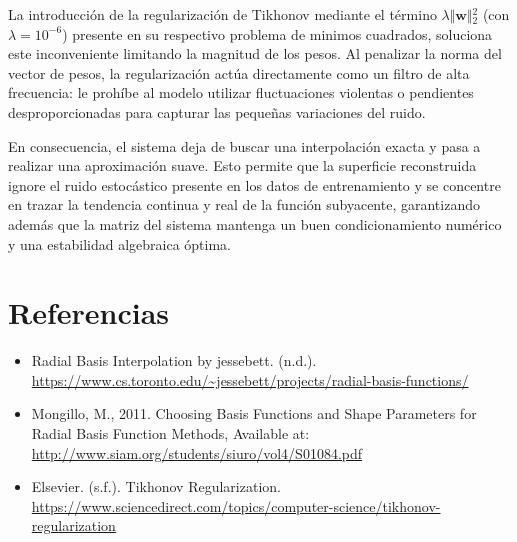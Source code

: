 \documentclass[12pt]{article}
\begin{document}
        La introducción de la regularización de Tikhonov mediante el término $\lambda \Vert{}\mathbf{w}\Vert{}_2^2$ (con $\lambda = 10^{-6}$) presente en su respectivo problema de minimos cuadrados, soluciona este inconveniente limitando la magnitud de los pesos. Al penalizar la norma del vector de pesos, la regularización actúa directamente como un filtro de alta frecuencia: le prohíbe al modelo utilizar fluctuaciones violentas o pendientes desproporcionadas para capturar las pequeñas variaciones del ruido.

        En consecuencia, el sistema deja de buscar una interpolación exacta y pasa a realizar una aproximación suave. Esto permite que la superficie reconstruida ignore el ruido estocástico presente en los datos de entrenamiento y se concentre en trazar la tendencia continua y real de la función subyacente, garantizando además que la matriz del sistema mantenga un buen condicionamiento numérico y una estabilidad algebraica óptima.

    \newpage

    \section{Referencias}
    \begin{itemize}
        \item Radial Basis Interpolation by jessebett. (n.d.). \url{https://www.cs.toronto.edu/~jessebett/projects/radial-basis-functions/}
        \item Mongillo, M., 2011. Choosing Basis Functions and Shape Parameters for Radial Basis Function Methods, Available at: \url{http://www.siam.org/students/siuro/vol4/S01084.pdf}
        \item Elsevier. (s.f.). Tikhonov Regularization. \url{https://www.sciencedirect.com/topics/computer-science/tikhonov-regularization}
    \end{itemize}
\end{document}
